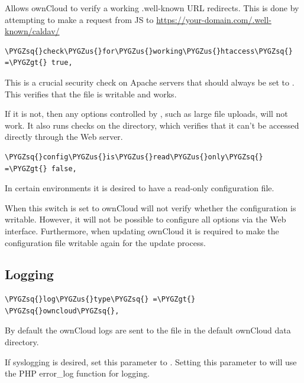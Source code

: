 \documentclass[letterpaper,10pt,english]{sphinxmanual}
\def\PYGZus{\char`\_}
\def\PYGZgt{\char`\>}
\def\PYGZsq{\char`\'}
\begin{document}
Allows ownCloud to verify a working .well-known URL redirects. This is done
by attempting to make a request from JS to
\href{https://your-domain.com/.well-known/caldav/}{https://your-domain.com/.well-known/caldav/}

\begin{Verbatim}[commandchars=\\\{\}]
\PYGZsq{}check\PYGZus{}for\PYGZus{}working\PYGZus{}htaccess\PYGZsq{} =\PYGZgt{} true,
\end{Verbatim}

This is a crucial security check on Apache servers that should always be set
to . This verifies that the  file is writable and works.

If it is not, then any options controlled by , such as large
file uploads, will not work. It also runs checks on the  directory,
which verifies that it can't be accessed directly through the Web server.

\begin{Verbatim}[commandchars=\\\{\}]
\PYGZsq{}config\PYGZus{}is\PYGZus{}read\PYGZus{}only\PYGZsq{} =\PYGZgt{} false,
\end{Verbatim}

In certain environments it is desired to have a read-only configuration file.

When this switch is set to  ownCloud will not verify whether the
configuration is writable. However, it will not be possible to configure
all options via the Web interface. Furthermore, when updating ownCloud
it is required to make the configuration file writable again for the update
process.


\subsection{Logging}
\label{configuration_server/config_sample_php_parameters:logging}
\begin{Verbatim}[commandchars=\\\{\}]
\PYGZsq{}log\PYGZus{}type\PYGZsq{} =\PYGZgt{} \PYGZsq{}owncloud\PYGZsq{},
\end{Verbatim}

By default the ownCloud logs are sent to the  file in the
default ownCloud data directory.

If syslogging is desired, set this parameter to .
Setting this parameter to  will use the PHP error\_log function
for logging.
\end{document}
